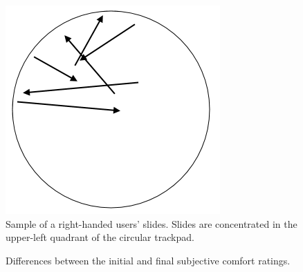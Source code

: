 \begin{figure}
\centering
\includegraphics[width=0.5\columnwidth]{figures/circle}
  \caption{Sample of a right-handed users' slides.  Slides are concentrated in the upper-left quadrant of the circular trackpad.}

\label{fig:circle}

\end{figure}

\begin{figure}
\centering



  \caption{
 Differences between the initial and final subjective comfort ratings.  
    }
\label{fig:graphLearning}
\end{figure}


